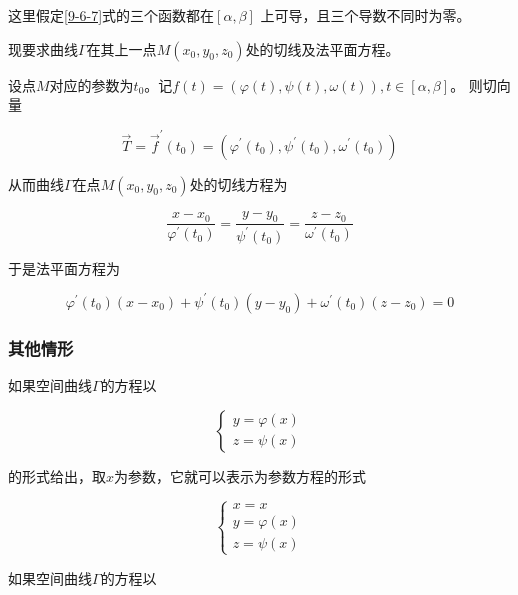 \documentclass[12pt, a4paper]{article}
\numberwithin{equation}{section}
\begin{document}
    这里假定\ref{9-6-7}式的三个函数都在\([\alpha, \beta]\)
    上可导，且三个导数不同时为零。

    现要求曲线\(\varGamma\)在其上一点\(M\left(x_0,y_0,z_0\right)\)处的切线及法平面方程。

    设点\(M\)对应的参数为\(t_0\)。记$f(t)=(\varphi(t), \psi(t), \omega(t)), t \in[\alpha, \beta]$。
    则切向量

    $$
        \overrightarrow{T}=\overrightarrow{f}^{\prime}\left(t_0\right)=
        \left(\varphi^{\prime}\left(t_0\right), \psi^{\prime}\left(t_0\right), \omega^{\prime}\left(t_0\right)\right)
    $$

    从而曲线\(\varGamma\)在点\(M\left(x_0,y_0,z_0\right)\)处的切线方程为

    \begin{equation}
        \frac{x-x_0}{\varphi^{\prime}\left(t_0\right)}=
        \frac{y-y_0}{\psi^{\prime}\left(t_0\right)}=\frac{z-z_0}{\omega^{\prime}\left(t_0\right)}
        \label{9-6-8}
    \end{equation}

    于是法平面方程为

    \begin{equation}
        \varphi^{\prime}\left(t_0\right)\left(x-x_0\right)+\psi^{\prime}\left(t_0\right)\left(y-y_0\right)+\omega^{\prime}\left(t_0\right)\left(z-z_0\right)=0
        \label{9-6-9}
    \end{equation}

\subsubsection{其他情形}

    如果空间曲线\(\varGamma\)的方程以

    $$
        \left\{\begin{array}{l}
            y=\varphi(x) \\
            z=\psi(x)
        \end{array}\right.
    $$

    的形式给出，取\(x\)为参数，它就可以表示为参数方程的形式

    $$
        \left\{\begin{array}{l}
            x=x \\
            y=\varphi(x) \\
            z=\psi(x)
        \end{array}\right.
    $$

    如果空间曲线\(\varGamma\)的方程以
\end{document}
